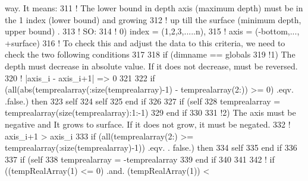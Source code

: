 \begin{DoxyCode}
{       way. It means:}
311                         \textcolor{comment}{! The lower bound in depth axis (maximum depth) must be in the 1 index (lower
       bound) and growing }
312                         \textcolor{comment}{! up till the surface (minimum depth, upper bound) .}
313                         \textcolor{comment}{! SO:}
314                         \textcolor{comment}{! 0) index = (1,2,3,.....n),}
315                         \textcolor{comment}{!    axis = (-bottom,..., +surface)}
316                         \textcolor{comment}{! To check this and adjust the data to this criteria, we need to check the two
       following conditions}
317 
318                         \textcolor{keywordflow}{if} (dimname == globals%
319                             \textcolor{comment}{!1) The depth must decrease in absolute value. If it does not decrease, must be
       reversed.}
320                             \textcolor{comment}{! |axis\_i - axis\_i+1| => 0}
321 
322                             \textcolor{keywordflow}{if} (all(abs(temprealarray(:\textcolor{keyword}{size}(temprealarray)-1) - temprealarray(2:)) >= 0) 
      .eqv. .false.)  \textcolor{keywordflow}{then}
323                                 self%
324                                 self%
325 \textcolor{keywordflow}{                            end if}
326 
327                             \textcolor{keywordflow}{if} (self%
328                                 temprealarray = temprealarray(\textcolor{keyword}{size}(temprealarray):1:-1)
329 \textcolor{keywordflow}{                            end if}
330 
331                             \textcolor{comment}{!2) The axis must be negative and It grows to surface. If it does not grow, it
       must be negated.}
332                             \textcolor{comment}{! axis\_i+1 > axis\_i}
333                             \textcolor{keywordflow}{if} (all(temprealarray(2:) >= temprealarray(:\textcolor{keyword}{size}(temprealarray)-1)) .eqv. .
      false.) \textcolor{keywordflow}{then}
334                                 self%
335 \textcolor{keywordflow}{                            end if}
336 
337                             \textcolor{keywordflow}{if} (self%
338                                 temprealarray = -temprealarray
339 \textcolor{keywordflow}{                            end if}
340 
341 
342                             \textcolor{comment}{! if ((tempRealArray(1) <= 0) .and. (tempRealArray(1)) <
}
\end{DoxyCode}
